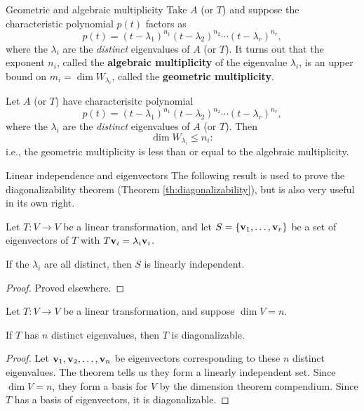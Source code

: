 \begin{frame}{Geometric and algebraic multiplicity}
Take $A$ (or $T$) and suppose the characteristic polynomial $p(t)$ factors as 
\[
p(t)=(t-\lambda_1)^{n_1}(t-\lambda_2)^{n_2}\cdots (t-\lambda_r)^{n_r},
\]
where the $\lambda_i$ are the {\em distinct} eigenvalues of $A$ (or $T$). It turns out that the exponent $n_i$, called the {\bf algebraic multiplicity} of the eigenvalue $\lambda_i$, is an upper bound on $m_i=\dim W_{\lambda_i}$, called the {\bf geometric multiplicity}. 
\pause
\begin{theorem}
Let $A$ (or $T$) have characterisitc polynomial 
\[
p(t)=(t-\lambda_1)^{n_1}(t-\lambda_2)^{n_2}\cdots (t-\lambda_r)^{n_r},
\]
where the $\lambda_i$ are the {\em distinct} eigenvalues of $A$ (or $T$). Then 
\[
\dim W_{\lambda_i}\leq n_i:
\]
i.e., the geometric multiplicity is less than or equal to the algebraic multiplicity. 
\end{theorem}
 
\end{frame}
\begin{frame}{Linear independence and eigenvectors}
The following result is used to prove the diagonalizability theorem (Theorem \ref{th:diagonalizability}), but is also very useful in its own right. 
\begin{theorem}\label{th:independentteigenvectors}
Let $T\colon V\rightarrow V$ be a linear transformation, and let $S=\{{\mathbf v}_1,\dots, {\mathbf v}_r\}$ be a set of eigenvectors of $T$ with $T{\mathbf v}_i=\lambda_i{\mathbf v}_i$. 

If the $\lambda_i$ are all distinct, then $S$ is linearly independent. 
\end{theorem}
\pause
\begin{proof}
Proved elsewhere.
\end{proof}
\pause
\begin{corollary}
Let $T\colon V\rightarrow V$ be a linear transformation, and suppose $\dim V=n$. 

If $T$ has $n$ \alert{distinct} eigenvalues, then $T$ is diagonalizable. 
\end{corollary}
\pause
\begin{proof}
Let ${\mathbf v}_1, {\mathbf v}_2,\dots, {\mathbf v}_n$ be eigenvectors corresponding to these $n$ distinct eigenvalues. The theorem tells us they form a linearly independent set. Since $\dim V=n$, they form a basis for $V$ by the dimension theorem compendium. Since $T$ has a basis of eigenvectors, it is diagonalizable. 
\end{proof}

\end{frame}
